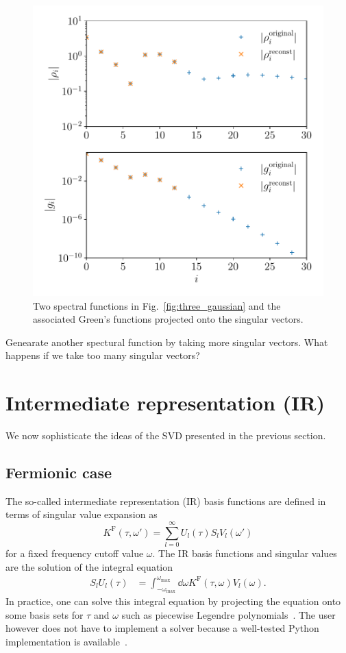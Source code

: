 \documentclass[submission, LectureNotes]{SciPost}
\newcommand{\wmax}{\ensuremath{{\omega_\mathrm{max}}}}
\newcommand{\KF}{\ensuremath{K^\mathrm{F}}}
\begin{document}
\begin{figure}
    \centering
    \includegraphics[width=0.6\columnwidth]{gi_rhoi.pdf}
    \caption{
      Two spectral functions in Fig.~\ref{fig:three_gaussian}
      and the associated Green's functions projected onto the singular vectors.
      }
    \label{fig:gi_rhoi}
\end{figure}





\begin{Exercise}
    Genearate another spectural function by taking more singular vectors.
    What happens if we take too many singular vectors?
\end{Exercise}


\clearpage



\section{Intermediate representation (IR)}
We now sophisticate the ideas of the SVD presented in the previous section.
\subsection{Fermionic case}
The so-called intermediate representation (IR) basis functions are defined in terms of singular value expansion as
\begin{equation}
    K^\mathrm{F}(\tau,\omega')=
    \sum_{l=0}^\infty U_l(\tau)S_l V_l(\omega')\label{eq:sve-tau}
\end{equation}
for a fixed frequency cutoff value $\omega$.
The IR basis functions and singular values are the solution of the integral equation
\begin{align}
    S_l U_l(\tau) &= \int_{-\wmax}^\wmax \dd\omega \KF(\tau, \omega) V_l(\omega).\label{eq:integral-eq}
\end{align}
In practice, one can solve this integral equation by projecting the equation onto some basis sets for $\tau$ and $\omega$
such as piecewise Legendre polynomials~\cite{Chikano:2018gd}.
The user however does not have to implement a solver because a well-tested Python implementation is available~\cite{irbasis3}.
\end{document}
